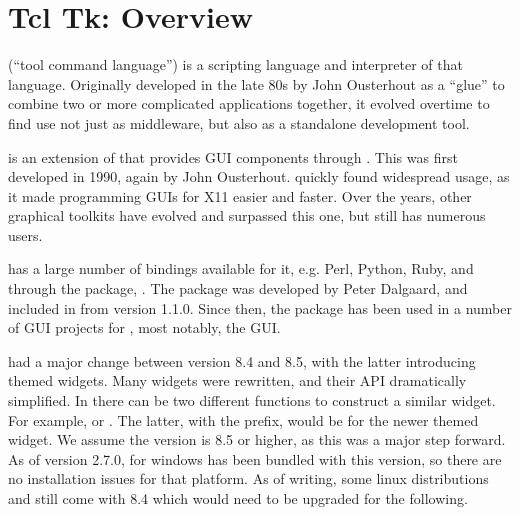  
\newcommand{\Event}[1]{$<$#1$>$}
\newcommand{\VirtualEvent}[1]{$<<$#1$>>$}



\chapter{Tcl Tk: Overview}

\TCL\/ (``tool command language'') is a scripting language and
interpreter of that language.  Originally developed in the late 80s by
John Ousterhout as a ``glue'' to combine two or more complicated
applications together, it evolved overtime to find use not just as
middleware, but also as a standalone development tool.

\TK\/ is an extension of \TCL\/ that provides GUI components through
\TCL.  This was first developed in 1990, again by John
Ousterhout. \TK\/ quickly found widespread usage, as it made
programming GUIs for X11 easier and faster. Over the years, other
graphical toolkits have evolved and surpassed this one, but \TK\/
still has numerous users.

\TK\/ has a large number of bindings available for it, e.g. Perl, Python,
Ruby, and through the  package, \R. The  package
was developed by Peter Dalgaard, and  included in \R\/ from version
1.1.0. Since then, the package has been used in a number of GUI 
projects for \R,  most notably, the  GUI.

\TK\/ had a major change between version 8.4 and 8.5, with the latter
introducing themed widgets. Many widgets were rewritten, and their API
dramatically simplified. In  there can be two different
functions to construct a similar widget. For example,
 or . The latter, with the
 prefix, would be for the newer themed widget. We assume the
\TK\/ version is 8.5 or higher, as this was a major step forward. As
of version 2.7.0, \R\/ for windows has been bundled with this \TK\/
version, so there are no installation issues for that platform. As of
writing, some linux distributions and \OSX\/ still come with 8.4 which
would need to be upgraded for the following.



